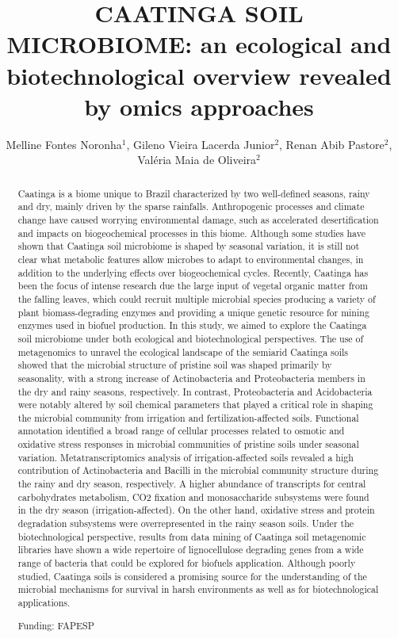 \documentclass[twoside]{article}
\title{\vspace{-15mm}\fontsize{24pt}{10pt}\selectfont\textbf{CAATINGA SOIL MICROBIOME: an ecological and biotechnological overview revealed by omics approaches}} %
\author{Melline Fontes Noronha$^1$, Gileno Vieira Lacerda Junior$^2$, Renan Abib Pastore$^2$, Val\'eria Maia de Oliveira$^2$}
\affil{1 CENTRO PLURIDISCIPLINAR DE PESQUISAS QU\'IMICAS BIOL\'OGICAS E AGR\'ICOLAS , UNICAMP\\ 2 MICROBIAL RESOURCES DIVISION, RESEARCH CENTER FOR CHEMISTRY, BIOLOGY AND AGRICULTURE, UNICAMP\\ }
\date{}
\begin{document}
\maketitle %

\thispagestyle{fancy} %


\begin{abstract}
Caatinga is a biome unique to Brazil characterized by two well-defined seasons, rainy and dry, mainly driven by the sparse rainfalls. Anthropogenic processes and climate change have caused worrying environmental damage, such as accelerated desertification and impacts on biogeochemical processes in this biome. Although some studies have shown that Caatinga soil microbiome is shaped by seasonal variation, it is still not clear what metabolic features allow microbes to adapt to environmental changes, in addition to the underlying effects over biogeochemical cycles. Recently, Caatinga has been the focus of intense research due the large input of vegetal organic matter from the falling leaves, which could recruit multiple microbial species producing a variety of plant biomass-degrading enzymes and providing a unique genetic resource for mining enzymes used in biofuel production. In this study, we aimed to explore the Caatinga soil microbiome under both ecological and biotechnological perspectives. The use of metagenomics to unravel the ecological landscape of the semiarid Caatinga soils showed that the microbial structure of pristine soil was shaped primarily by seasonality, with a strong increase of Actinobacteria and Proteobacteria members in the dry and rainy seasons, respectively. In contrast, Proteobacteria and Acidobacteria were notably altered by soil chemical parameters that played a critical role in shaping the microbial community from irrigation and fertilization-affected soils. Functional annotation identified a broad range of cellular processes related to osmotic and oxidative stress responses in microbial communities of pristine soils under seasonal variation. Metatranscriptomics analysis of irrigation-affected soils revealed a high contribution of Actinobacteria and Bacilli in the microbial community structure during the rainy and dry season, respectively. A higher abundance of transcripts for central carbohydrates metabolism, CO2 fixation and monosaccharide subsystems were found in the dry season (irrigation-affected). On the other hand, oxidative stress and protein degradation subsystems were overrepresented in the rainy season soils. Under the biotechnological perspective, results from data mining of Caatinga soil metagenomic libraries have shown a wide repertoire of lignocellulose degrading genes from a wide range of bacteria that could be explored for biofuels application.  Although poorly studied, Caatinga soils is considered a promising source for the understanding of the microbial mechanisms for survival in harsh environments as well as for biotechnological applications.

Funding: FAPESP
\end{abstract}
\end{document}
